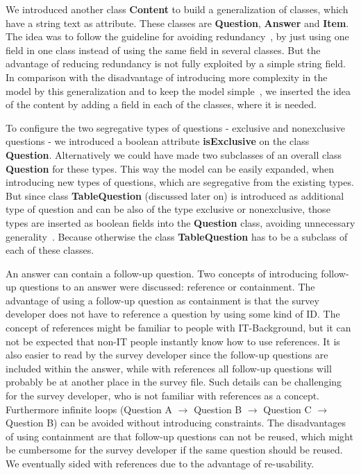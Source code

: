 \documentclass[runningheads,a4paper]{llncs}
\begin{document}
We introduced another class \textbf{Content} to build a generalization of classes, which have a string text as attribute. These classes are \textbf{Question}, \textbf{Answer} and \textbf{Item}. The idea was to follow the guideline for avoiding redundancy~\cite{karsai}, by just using one field in one class instead of using the same field in several classes. But the advantage of reducing redundancy is not fully exploited by a simple string field. In comparison with the disadvantage of introducing more complexity in the model by this generalization and to keep the model simple~\cite{karsai}, we inserted the idea of the content by adding a field in each of the classes, where it is needed.

To configure the two segregative types of questions - exclusive and nonexclusive questions - we introduced a boolean attribute \textbf{isExclusive} on the class \textbf{Question}. Alternatively we could have made two subclasses of an overall class \textbf{Question} for these types. This way the model can be easily expanded, when introducing new types of questions, which are segregative from the existing types. But since class \textbf{TableQuestion} (discussed later on) is introduced as additional type of question and can be also of the type exclusive or nonexclusive, those types are inserted as boolean fields into the \textbf{Question} class, avoiding unnecessary generality~\cite{karsai}. Because otherwise the class \textbf{TableQuestion} has to be a subclass of each of these classes.

An answer can contain a follow-up question. Two concepts of introducing follow-up questions to an answer were discussed: reference or containment. The advantage of using a follow-up question as containment is that the survey developer does not have to reference a question by using some kind of ID. The concept of references might be familiar to people with IT-Background, but it can not be expected that non-IT people instantly know how to use references. It is also easier to read by the survey developer since the follow-up questions are included within the answer, while with references all follow-up questions will probably be at another place in the survey file. Such details can be challenging for the survey developer, who is not familiar with references as a concept. Furthermore infinite loops (Question A $\to$ Question B $\to$ Question C $\to$ Question B) can be avoided without introducing constraints. The disadvantages of using containment are that follow-up questions can not be reused, which might be cumbersome for the survey developer if the same question should be reused. We eventually sided with references due to the advantage of re-usability.
\end{document}
